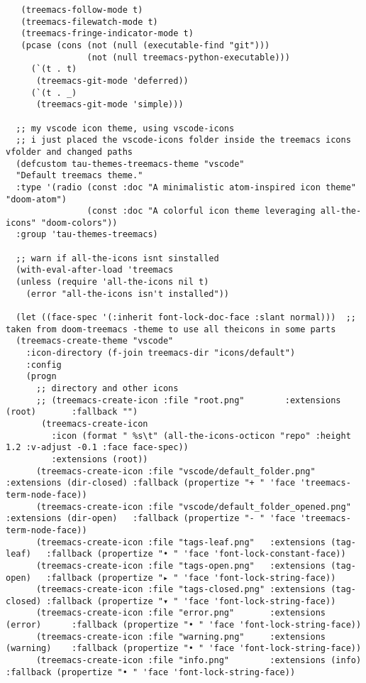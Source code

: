 \documentclass[11pt]{article}
\begin{document}
\begin{verbatim}
   (treemacs-follow-mode t)
   (treemacs-filewatch-mode t)
   (treemacs-fringe-indicator-mode t)
   (pcase (cons (not (null (executable-find "git")))
                (not (null treemacs-python-executable)))
     (`(t . t)
      (treemacs-git-mode 'deferred))
     (`(t . _)
      (treemacs-git-mode 'simple)))

  ;; my vscode icon theme, using vscode-icons
  ;; i just placed the vscode-icons folder inside the treemacs icons vfolder and changed paths
  (defcustom tau-themes-treemacs-theme "vscode"
  "Default treemacs theme."
  :type '(radio (const :doc "A minimalistic atom-inspired icon theme" "doom-atom")
                (const :doc "A colorful icon theme leveraging all-the-icons" "doom-colors"))
  :group 'tau-themes-treemacs)

  ;; warn if all-the-icons isnt sinstalled
  (with-eval-after-load 'treemacs
  (unless (require 'all-the-icons nil t)
    (error "all-the-icons isn't installed"))

  (let ((face-spec '(:inherit font-lock-doc-face :slant normal)))  ;; taken from doom-treemacs -theme to use all theicons in some parts
  (treemacs-create-theme "vscode"
    :icon-directory (f-join treemacs-dir "icons/default")
    :config
    (progn
      ;; directory and other icons
      ;; (treemacs-create-icon :file "root.png"        :extensions (root)       :fallback "")
       (treemacs-create-icon
         :icon (format " %s\t" (all-the-icons-octicon "repo" :height 1.2 :v-adjust -0.1 :face face-spec))
         :extensions (root))
      (treemacs-create-icon :file "vscode/default_folder.png"  :extensions (dir-closed) :fallback (propertize "+ " 'face 'treemacs-term-node-face))
      (treemacs-create-icon :file "vscode/default_folder_opened.png"    :extensions (dir-open)   :fallback (propertize "- " 'face 'treemacs-term-node-face))
      (treemacs-create-icon :file "tags-leaf.png"   :extensions (tag-leaf)   :fallback (propertize "• " 'face 'font-lock-constant-face))
      (treemacs-create-icon :file "tags-open.png"   :extensions (tag-open)   :fallback (propertize "▸ " 'face 'font-lock-string-face))
      (treemacs-create-icon :file "tags-closed.png" :extensions (tag-closed) :fallback (propertize "▾ " 'face 'font-lock-string-face))
      (treemacs-create-icon :file "error.png"       :extensions (error)      :fallback (propertize "• " 'face 'font-lock-string-face))
      (treemacs-create-icon :file "warning.png"     :extensions (warning)    :fallback (propertize "• " 'face 'font-lock-string-face))
      (treemacs-create-icon :file "info.png"        :extensions (info)       :fallback (propertize "• " 'face 'font-lock-string-face))


\end{verbatim}
\end{document}
